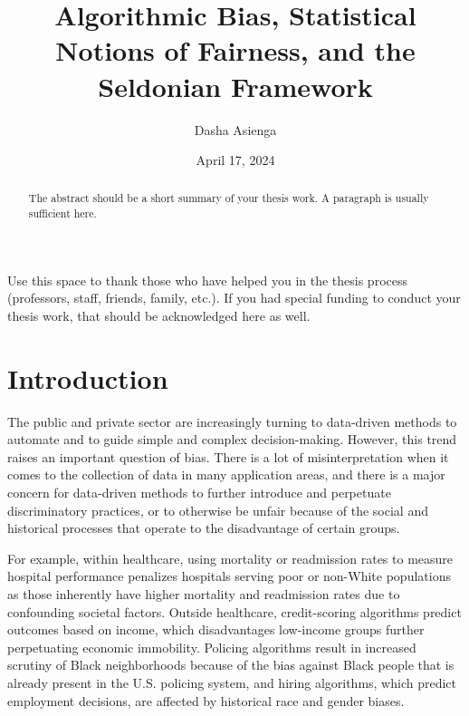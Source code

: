 \documentclass[12pt, twoside]{amherstthesis}
\title{Algorithmic Bias, Statistical Notions of Fairness, and the Seldonian Framework}
\author{Dasha Asienga}
\date{April 17, 2024}
\begin{document}
\doublespace
  \maketitle

\frontmatter %
\pagestyle{fancyplain}

  \begin{abstract}
    The abstract should be a short summary of your thesis work. A paragraph is usually sufficient here.
  \end{abstract}
  \begin{acknowledgments}
    Use this space to thank those who have helped you in the thesis process (professors, staff, friends, family, etc.). If you had special funding to conduct your thesis work, that should be acknowledged here as well.
  \end{acknowledgments}

  \hypersetup{linkcolor=black}
  \setcounter{tocdepth}{2}
  \tableofcontents

  \listoftables

  \listoffigures


\mainmatter %
\pagestyle{fancyplain} %

\hypertarget{intro}{%
\chapter{Introduction}\label{intro}}

The public and private sector are increasingly turning to data-driven methods to automate and to guide simple and complex decision-making. However, this trend raises an important question of bias. There is a lot of misinterpretation when it comes to the collection of data in many application areas, and there is a major concern for data-driven methods to further introduce and perpetuate discriminatory practices, or to otherwise be unfair because of the social and historical processes that operate to the disadvantage of certain groups.

For example, within healthcare, using mortality or readmission rates to measure hospital performance penalizes hospitals serving poor or non-White populations as those inherently have higher mortality and readmission rates due to confounding societal factors. Outside healthcare, credit-scoring algorithms predict outcomes based on income, which disadvantages low-income groups further perpetuating economic immobility. Policing algorithms result in increased scrutiny of Black neighborhoods because of the bias against Black people that is already present in the U.S. policing system, and hiring algorithms, which predict employment decisions, are affected by historical race and gender biases.
\end{document}
